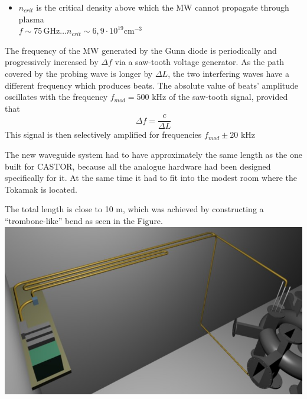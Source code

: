 \documentclass[portrait,final,a0paper]{baposter}
\begin{document}
\begin{poster}
{\begin{multicols}{2}
\begin{itemize}
\item $n_{crit}$ is the critical density above which the MW cannot propagate through plasma\\ $f \sim 75 \,\text{GHz} \ldots n_{crit} \sim 6,9 \cdot 10^{19} \text{cm}^{-3}$
\end{itemize}
\end{multicols}
 }
 {
 The frequency of the MW generated by the Gunn diode is periodically and progressively increased by $\Delta f$ via a saw-tooth voltage generator. As the path covered by the probing wave is longer by $\Delta L$, the two interfering waves have a different frequency which produces beats. The absolute value of beats' amplitude oscillates with the frequency $f_{mod}=500$ kHz of the saw-tooth signal, provided that\begin{equation}
     \Delta f = \frac{c}{\Delta L} 
     \label{eq:mod}
 \end{equation}
 This signal is then selectively amplified for frequencies $ f_{mod} \pm 20$ kHz
 }



{
\begin{multicols}{2}
 The new waveguide system had to have approximately the same length as the one built for CASTOR, because all the analogue hardware had been designed specifically for it. At the same time it had to fit into the modest room where the Tokamak is located.

The total length is close to 10 m, which was achieved by constructing a ``trombone-like'' bend as seen in the Figure. \\
 \includegraphics[width=.48\textwidth]{images/vlnovody.jpg}
\end{multicols}
}


\end{poster}
\end{document}
